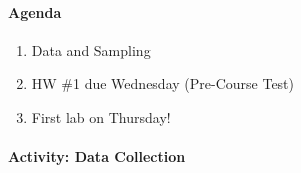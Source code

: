 \documentclass[10pt]{article}
\begin{document}


\paragraph{Agenda}
\begin{enumerate}
  \itemsep0em
  \item Data and Sampling
  \item HW \#1 due Wednesday (Pre-Course Test)
  \item First lab on Thursday!
\end{enumerate}

\paragraph{Activity: Data Collection}
\end{document}
